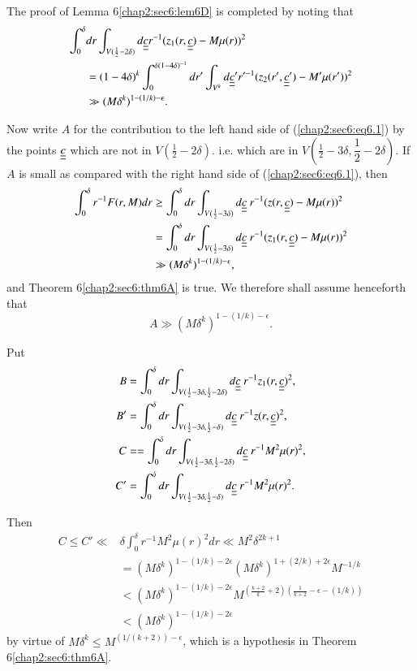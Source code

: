 The proof of Lemma 6\ref{chap2:sec6:lem6D} is completed by noting that
\begin{align*}
\int_{0}^{\delta} & dr \int_{V(\frac{1}{2} - 2\delta)} d\underline{\underline{c}} r^{-1} (z_{1} (r, \underline{\underline{c}}) - M\mu(r))^{2}\\
& = (1-4\delta)^{k} \int_{0}^{\delta(1-4\delta)^{-1}} dr' \int_{V^{k}} d\underline{\underline{c}}' r'^{-1} (z_{2}(r', \underline{\underline{c}}') - M' \mu(r'))^{2}\\
& \gg (M\delta^{k})^{1-(1/k)-\epsilon}.
\end{align*}

Now write $A$ for the contribution to the left hand side of
(\ref{chap2:sec6:eq6.1}) by the points $\underline{\underline{c}}$ which are not in
$V\left(\frac{1}{2} - 2\delta\right)$. i.e. which are in $V
\left(\frac{1}{2} - 3\delta, \dfrac{1}{2} - 2\delta\right)$. If $A$
is small as compared with the right hand side of
(\ref{chap2:sec6:eq6.1}), then 
\begin{align*}
\int_{0}^{\delta} r^{-1} F(r, M) dr & \geq \int_{0}^{\delta} dr \int_{V(\frac{1}{2} - 3\delta)} d\underline{\underline{c}}~ r^{-1} (z(r, \underline{\underline{c}}) - M\mu(r))^{2}\\
& = \int_{0}^{\delta} dr \int_{V(\frac{1}{2} - 3\delta)} d\underline{\underline{c}}~ r^{-1} (z_{1} (r, \underline{\underline{c}}) - M\mu(r))^{2}\\
& \gg (M \delta^{k})^{1-(1/k)-\epsilon},
\end{align*}
and Theorem 6\ref{chap2:sec6:thm6A} is true. We therefore shall assume henceforth that
\begin{equation*}
A \gg (M \delta^{k})^{1-(1/k) - \epsilon} . \tag{6.4}\label{chap2:sec6:eq6.4}
\end{equation*}

Put
\begin{align*}
B & = \int_{0}^{\delta} dr \int_{V(\frac{1}{2} - 3\delta, \frac{1}{2} - 2\delta)} d\underline{\underline{c}} ~r^{-1} z_{1} (r, \underline{\underline{c}})^{2},\\
B' & = \int_{0}^{\delta} dr \int_{V(\frac{1}{2} - 3\delta, \frac{1}{2} - \delta)} d\underline{\underline{c}} ~r^{-1} z(r, \underline{\underline{c}})^{2},\\
C & = = \int_{0}^{\delta} dr \int_{V(\frac{1}{2} - 3\delta, \frac{1}{2} - 2\delta)} d\underline{\underline{c}}~ r^{-1} M^{2} \mu (r)^{2},\\
C' & = \int_{0}^{\delta} dr \int_{V(\frac{1}{2} - 3\delta, \frac{1}{2} - \delta)} d\underline{\underline{c}} ~r^{-1} M^{2} \mu (r)^{2}.
\end{align*}\pageoriginale

Then
\begin{align*}
C \leq C' \ll & \delta \int_{0}^{\delta} r^{-1} M^{2} \mu (r)^{2} dr \ll M^{2} \delta^{2k+1}\\
& = (M \delta^{k})^{1-(1/k)-2\epsilon} (M \delta^{k})^{1+(2/k)+2\epsilon} M^{-1/k}\\
& < (M \delta^{k})^{1-(1/k)-2\epsilon} M^{(\frac{k+2}{k} + 2)(\frac{1}{k+2} - \epsilon -(1/k))}\tag{6.5}\label{chap2:sec6:eq6.5}\\
& < (M \delta^{k})^{1-(1/k)-2\epsilon}
\end{align*}
by virtue of $M \delta^{k} \leq M^{(1/(k+2)) - \epsilon}$, which is a hypothesis in Theorem 6\ref{chap2:sec6:thm6A}.

